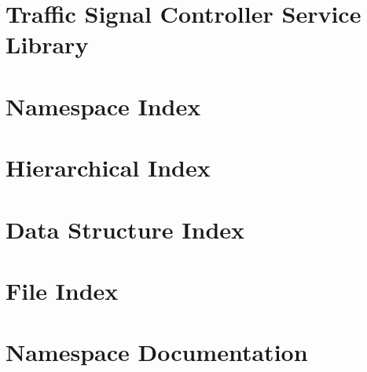 \let\mypdfximage\pdfximage\def\pdfximage{\immediate\mypdfximage}\documentclass[twoside]{book}
\newcommand{\+}{\discretionary{\mbox{\scriptsize$\hookleftarrow$}}{}{}}
\begin{document}
\chapter{Traffic Signal Controller Service Library}
\label{md_tsc_client_service_README}

\chapter{Namespace Index}

\chapter{Hierarchical Index}

\chapter{Data Structure Index}

\chapter{File Index}

\chapter{Namespace Documentation}
























\end{document}
